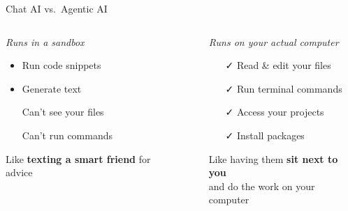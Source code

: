 \documentclass[aspectratio=169, 10pt]{beamer}
\begin{document}
\begin{frame}{Chat AI vs.\ Agentic AI}
\begin{columns}[T]
\begin{column}{0.44\textwidth}
\begin{tcolorbox}[colback=PaleSage, colframe=CoolGray, boxrule=0.6pt, arc=3pt, left=5pt, right=5pt, top=3pt, bottom=3pt, title={\faComments\quad ChatGPT / Claude Web}, fonttitle=\bfseries\scriptsize, coltitle=DeepCharcoal, colbacktitle=PaleSage!80]
\centering
{\scriptsize\color{SoftCoral}\textit{Runs in a sandbox}}
\vskip4pt
\begin{itemize}\small\setlength{\itemsep}{1pt}
  \item Run code snippets
  \item Generate text
  \item[\color{SoftCoral}\faTimes] Can't see your files
  \item[\color{SoftCoral}\faTimes] Can't run commands
\end{itemize}
\end{tcolorbox}
\vskip4pt
\centering
{\scriptsize\color{CoolGray} Like \textbf{texting a smart friend} for advice}
\end{column}
\begin{column}{0.06\textwidth}
\centering\vskip1.2cm
{\large\color{UVMGold}\faArrowRight}
\end{column}
\begin{column}{0.44\textwidth}
\begin{tcolorbox}[colback=LightGold, colframe=UVMGold, boxrule=0.6pt, arc=3pt, left=5pt, right=5pt, top=3pt, bottom=3pt, title={\faTerminal\quad Claude Code / Codex}, fonttitle=\bfseries\scriptsize, coltitle=DeepCharcoal, colbacktitle=LightGold!80]
\centering
{\scriptsize\color{SlateTeal}\textit{Runs on your actual computer}}
\vskip4pt
\begin{itemize}\small\setlength{\itemsep}{1pt}
  \item[\color{SlateTeal}\faCheck] Read \& edit your files
  \item[\color{SlateTeal}\faCheck] Run terminal commands
  \item[\color{SlateTeal}\faCheck] Access your projects
  \item[\color{SlateTeal}\faCheck] Install packages
\end{itemize}
\end{tcolorbox}
\vskip4pt
\centering
{\scriptsize\color{CoolGray} Like having them \textbf{sit next to you}\\and do the work on your computer}
\end{column}
\end{columns}
\end{frame}
\end{document}
